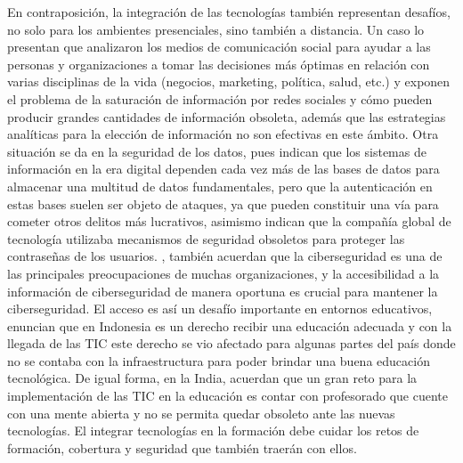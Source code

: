 \documentclass{textolivre}
\begin{document}
En contraposición, la integración de las tecnologías también representan desafíos, no solo para los ambientes presenciales, sino también a distancia. Un caso lo presentan \textcite{sebei_review_2018} que analizaron los medios de comunicación social para ayudar a las personas y organizaciones a tomar las decisiones más óptimas en relación con varias disciplinas de la vida (negocios, marketing, política, salud, etc.) y exponen el problema de la saturación de información por redes sociales y cómo pueden producir grandes cantidades de información obsoleta, además que las estrategias analíticas para la elección de información no son efectivas en este ámbito. Otra situación se da en la seguridad de los datos, pues \textcite{blue_novel_2017} indican que  los sistemas de información en la era digital dependen cada vez más de las bases de datos para almacenar una multitud de datos fundamentales, pero que la autenticación en estas bases suelen ser objeto de ataques, ya que pueden constituir una vía para cometer otros delitos más lucrativos, asimismo indican que la compañía global de tecnología utilizaba mecanismos de seguridad obsoletos para proteger las contraseñas de los usuarios. \textcite{takahashi_web_2018}, también acuerdan que la ciberseguridad es una de las principales preocupaciones de muchas organizaciones, y la accesibilidad a la información de ciberseguridad de manera oportuna es crucial para mantener la ciberseguridad. El acceso es así un desafío importante en entornos educativos, \textcite{roslina_role_2017} enuncian que en Indonesia es un derecho recibir una educación adecuada y con la llegada de las TIC este derecho se vio afectado para algunas partes del país donde no se contaba con la infraestructura para poder brindar una buena educación tecnológica. De igual forma, \textcite{thankachan_challenges_2017} en la India, acuerdan que un gran reto para la implementación de las TIC en la educación es contar con profesorado que cuente con una mente abierta y no se permita quedar obsoleto ante las nuevas tecnologías. El integrar tecnologías en la formación debe cuidar los retos de formación, cobertura y seguridad que también traerán con ellos.
\end{document}
